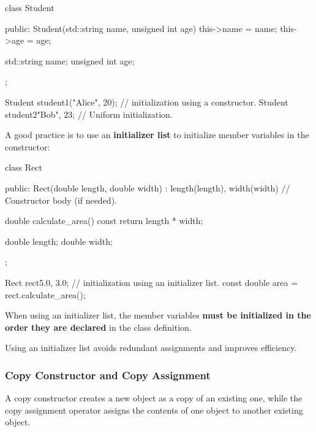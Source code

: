 \begin{codeblock}[language=C++]
class Student {
public:
    Student(std::string name, unsigned int age) {
        this->name = name;
        this->age = age;
    }

    std::string name;
    unsigned int age;
};

Student student1("Alice", 20); // initialization using a constructor.
Student student2{"Bob", 23}; // Uniform initialization.
\end{codeblock}

\vspace{-0.3em}

A good practice is to use an \textbf{initializer list} to initialize member variables in the constructor:

\vspace{-0.3em}

\begin{codeblock}[language=C++]
class Rect {
public:
    Rect(double length, double width) : length(length), width(width) {
        // Constructor body (if needed).
    }

    double calculate_area() const {
        return length * width;
    }

    double length;
    double width;
};

Rect rect{5.0, 3.0}; // initialization using an initializer list.
const double area = rect.calculate_area();
\end{codeblock}

When using an initializer list, the member variables \textbf{must be initialized in the order they are declared} in the class definition.

\vspace{-0.3em}

\begin{tipsblock}
Using an initializer list avoids redundant assignments and improves efficiency.
\end{tipsblock}

\vspace{-1em}

\subsubsection{Copy Constructor and Copy Assignment}

\vspace{-0.3em}

A copy constructor creates a new object as a copy of an existing one, while the copy assignment operator assigns the contents of one object to another existing object.

